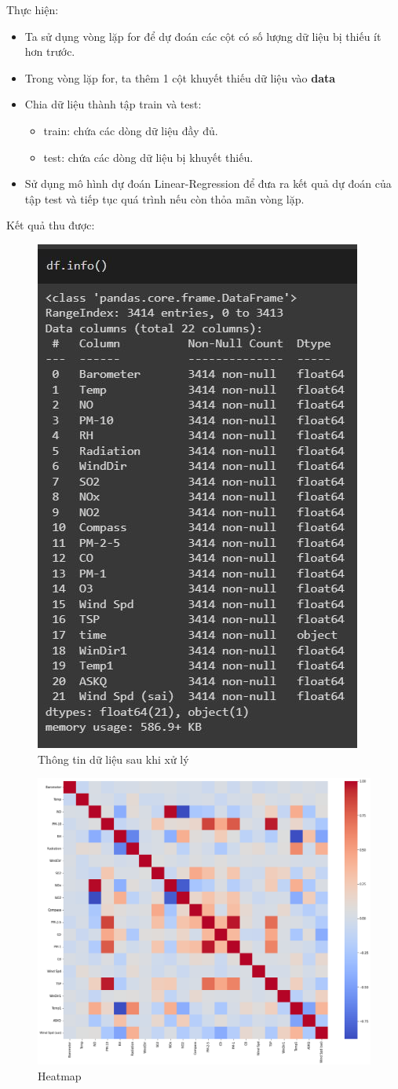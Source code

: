 \noindent Thực hiện:
\begin{itemize}
    \item Ta sử dụng vòng lặp for để dự đoán các cột có số lượng dữ liệu bị thiếu ít hơn trước. 
    \item Trong vòng lặp for, ta thêm 1 cột khuyết thiếu dữ liệu vào \textbf{data}
    \item Chia dữ liệu thành tập train và test:
    \begin{itemize}
        \item train: chứa các dòng dữ liệu đầy đủ.
        \item test: chứa các dòng dữ liệu bị khuyết thiếu.
    \end{itemize}
    \item Sử dụng mô hình dự đoán Linear-Regression để đưa ra kết quả dự đoán của tập test và tiếp tục quá trình nếu còn thỏa mãn vòng lặp.
\end{itemize}
\newpage
\noindent Kết quả thu được:
\begin{figure}[H]
    \centering
    \includegraphics[width=.3\textwidth]{figures/info.jpg}
    \caption[Thông tin dữ liệu sau khi xử lý]{Thông tin dữ liệu sau khi xử lý}
\end{figure}

\begin{figure}[H]
    \centering
    \includegraphics[width=.9\textwidth]{figures/matran.png}
    \caption[Heatmap]{Heatmap}
\end{figure}

